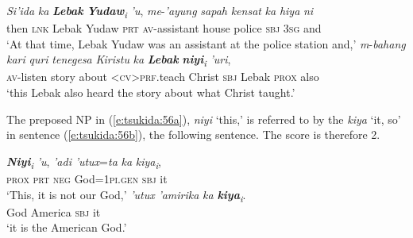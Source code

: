 \documentclass[output=paper
,modfonts
,nonflat]{langsci/langscibook}
\begin{document}
\begin{exe}
	\label{e:tsukida:55}
	\begin{xlist}
		\ex\label{e:tsukida:55a}
		\gll \textit{Si'ida}  \textit{ka} \textbf{\textit{Lebak}}  \textbf{\textit{Yudaw}}\textit{\textsubscript{i}} \textit{'u},  \textit{me}-\textit{'ayung}  \textit{sapah}  \textit{kensat}  \textit{ka}  \textit{hiya}   \textit{ni}\\
		then \textsc{lnk} Lebak Yudaw \textsc{prt} \textsc{av}-assistant  house  police \textsc{sbj} \textsc{3sg} and\\
		\glt ‘At that time, Lebak Yudaw was an assistant at the police station and,’
		\ex\label{e:tsukida:55b}
		\gll \textit{m}-\textit{bahang}   \textit{kari}  \textit{quri}  \textit{t}{\USSmaller}\textit{en}{\USGreater}\textit{egesa}       \textit{Kiristu}  \textit{ka} \textbf{\textit{Lebak}}  \textbf{\textit{niyi}}\textit{\textsubscript{i}} \textit{'uri},\\
		\textsc{av}-listen story about <\textsc{cv}>\textsc{prf}.teach Christ \textsc{sbj}   Lebak  \textsc{prox} also\\
		\glt ‘this Lebak also heard the story about what Christ taught.’
	\end{xlist}
\end{exe}

\noindent
The preposed NP in (\ref{e:tsukida:56a}), \textit{niyi} ‘this,’ is referred to by the  \textit{kiya} ‘it, so’ in sentence (\ref{e:tsukida:56b}), the following sentence. The score is therefore 2.

\begin{exe}
	\label{e:tsukida:56}
	\begin{xlist}
		\ex\label{e:tsukida:56a}
		\gll \textbf{\textit{Niyi}}\textit{\textsubscript{i}} \textit{'u},  \textit{'adi}  \textit{'utux}=\textit{ta}       \textit{ka}  \textit{kiya}\textit{\textsubscript{i}},\\
		\textsc{prox} \textsc{prt} \textsc{neg} God=\textsc{1pi.gen} \textsc{sbj} it\\
		\glt ‘This, it is not our God,’
		\ex\label{e:tsukida:56b}
		\gll \textit{'utux}  \textit{'amirika}       \textit{ka} \textbf{\textit{kiya}}\textit{\textsubscript{i}}.\\
		God    America \textsc{sbj} it\\
		\glt ‘it is the American God.’
	\end{xlist}
\end{exe}
\end{document}
